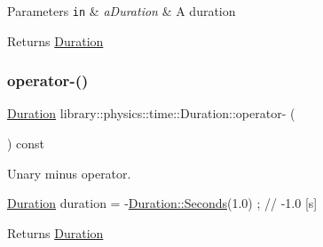 \begin{DoxyParams}[1]{Parameters}
\mbox{\tt in}  & {\em a\+Duration} & A duration \\
\hline
\end{DoxyParams}
\begin{DoxyReturn}{Returns}
\hyperlink{classlibrary_1_1physics_1_1time_1_1_duration}{Duration} 
\end{DoxyReturn}
\mbox{\label{classlibrary_1_1physics_1_1time_1_1_duration_a9f2fa54832b4ef58c48167c80285bad2}} 
\subsubsection{\texorpdfstring{operator-\/()}{operator-()}\hspace{0.1cm}{\footnotesize\ttfamily [2/2]}}
{\footnotesize\ttfamily \hyperlink{classlibrary_1_1physics_1_1time_1_1_duration}{Duration} library\+::physics\+::time\+::\+Duration\+::operator-\/ (\begin{DoxyParamCaption}{ }\end{DoxyParamCaption}) const}



Unary minus operator. 


\begin{DoxyCode}
\hyperlink{classlibrary_1_1physics_1_1time_1_1_duration_a0a70efcf487a841da572afcf00001f64}{Duration} duration = -\hyperlink{classlibrary_1_1physics_1_1time_1_1_duration_ae10891c94a1b2278c444cb44b37132f1}{Duration::Seconds}(1.0) ; \textcolor{comment}{// -1.0 [s]}
\end{DoxyCode}


\begin{DoxyReturn}{Returns}
\hyperlink{classlibrary_1_1physics_1_1time_1_1_duration}{Duration} 
\end{DoxyReturn}
\mbox{\label{classlibrary_1_1physics_1_1time_1_1_duration_a49e7a4be10cf8cade127314a80b4180e}} 

